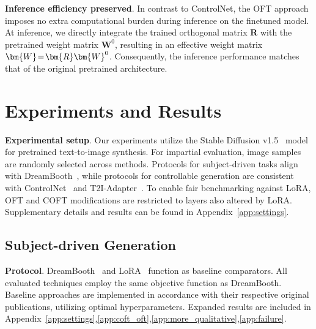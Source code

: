 \textbf{Inference efficiency preserved}. In contrast to ControlNet, the OFT approach imposes no extra computational burden during inference on the finetuned model. At inference, we directly integrate the trained orthogonal matrix $\bm{R}$ with the pretrained weight matrix $\bm{W}^0$, resulting in an effective weight matrix $\thickmuskip=2mu \medmuskip=2mu \bm{W}=\bm{R}\bm{W}^0$. Consequently, the inference performance matches that of the original pretrained architecture.

\section{Experiments and Results}

\textbf{Experimental setup}. Our experiments utilize the Stable Diffusion v1.5~\cite{rombach2022high} model for pretrained text-to-image synthesis. For impartial evaluation, image samples are randomly selected across methods. Protocols for subject-driven tasks align with DreamBooth~\cite{ruiz2023dreambooth}, while protocols for controllable generation are consistent with ControlNet~\cite{zhang2023adding} and T2I-Adapter~\cite{mou2023t2i}. To enable fair benchmarking against LoRA, OFT and COFT modifications are restricted to layers also altered by LoRA. Supplementary details and results can be found in Appendix~\ref{app:settings}.

\subsection{Subject-driven Generation}

\textbf{Protocol}. DreamBooth~\cite{ruiz2023dreambooth} and LoRA~\cite{hulora2022} function as baseline comparators. All evaluated techniques employ the same objective function as DreamBooth. Baseline approaches are implemented in accordance with their respective original publications, utilizing optimal hyperparameters. Expanded results are included in Appendix~\ref{app:settings},\ref{app:coft_oft},\ref{app:more_qualitative},\ref{app:failure}.

